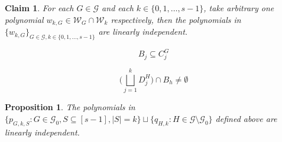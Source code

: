 \documentclass[10pt,a4paper]{amsart}
\newtheorem{claim}{Claim}
\newtheorem{prop}{Proposition}
\begin{document}
\begin{claim}\label{claim:SudakovsBound}
    For each \(G\in\mathcal{G}\) and each \(k\in\{0,1,\ldots,s-1\}\), take arbitrary one polynomial \(w_{k,G}\in\mathcal{W}_{G}\cap \mathcal{W}_{k}\) respectively, then the polynomials in \(\{w_{k,G}\}_{G\in\mathcal{G},k\in \{0,1,\ldots,s-1\}}\) are linearly independent.
\end{claim}

\begin{equation}\label{containment:BjCj}
    B_{j}\subseteq C_{j}^{G}
\end{equation}

\begin{equation}\label{RelationBDBD}
    \bigg(\bigsqcup_{j=1}^{k}D_{j}^{H}\bigg)\cap B_{h}\neq\emptyset
\end{equation}

\begin{prop}\label{claim:FinalLinearInd}
   The polynomials in \(\{p_{G,k,S}:G\in \mathcal{G}_{0},S\subseteq [s-1],|S|=k\}\sqcup \{q_{H,k}: H\in \mathcal{G}\setminus\mathcal{G}_{0}\}\) defined above are linearly independent. 
\end{prop}
\end{document}
